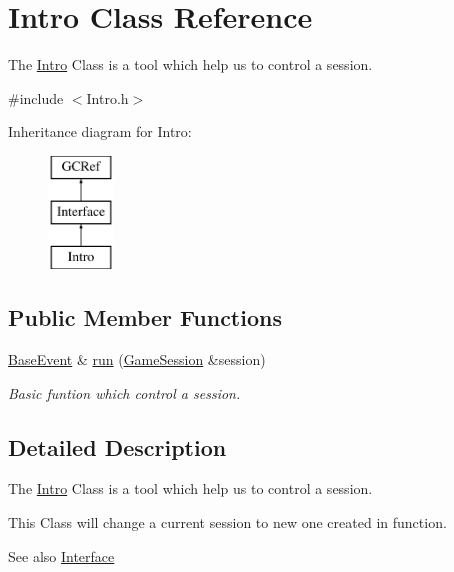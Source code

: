 \hypertarget{classIntro}{}\section{Intro Class Reference}
\label{classIntro}


The \hyperlink{classIntro}{Intro} Class is a tool which help us to control a session.  




{\ttfamily \#include $<$Intro.\+h$>$}

Inheritance diagram for Intro\+:\begin{figure}[H]
\begin{center}
\leavevmode
\includegraphics[height=3.000000cm]{classIntro}
\end{center}
\end{figure}
\subsection*{Public Member Functions}
\begin{DoxyCompactItemize}
\item 
\hyperlink{classBaseEvent}{Base\+Event} \& \hyperlink{classIntro_a3a8f112a89ee8c03e481910173ed5a33}{run} (\hyperlink{classGameSession}{Game\+Session} \&session)
\begin{DoxyCompactList}\small\item\em Basic funtion which control a session. \end{DoxyCompactList}\end{DoxyCompactItemize}


\subsection{Detailed Description}
The \hyperlink{classIntro}{Intro} Class is a tool which help us to control a session. 

This Class will change a current session to new one created in function.

\begin{DoxySeeAlso}{See also}
\hyperlink{classInterface}{Interface} 
\end{DoxySeeAlso}


